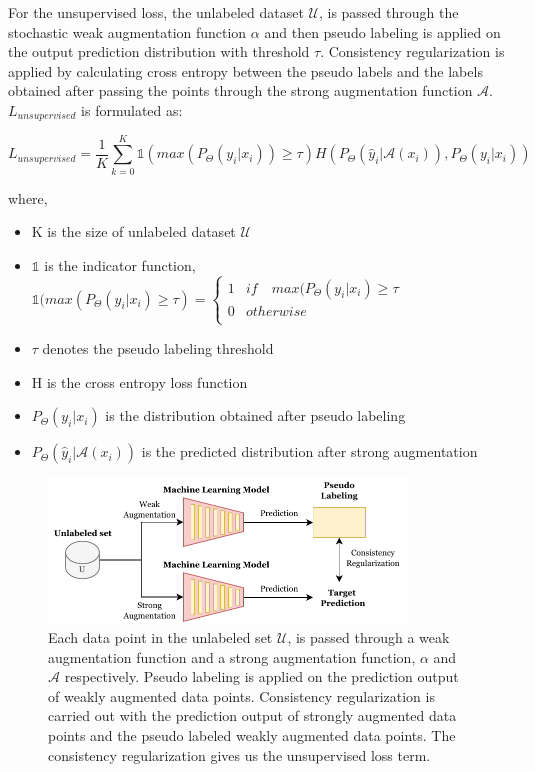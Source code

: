 For the unsupervised loss, the unlabeled dataset $\mathcal{U}$, is passed through the stochastic weak augmentation function $\alpha$ and then pseudo labeling is applied on the output prediction distribution with threshold $\tau$. Consistency regularization is applied by calculating cross entropy between the pseudo labels and the labels obtained after passing the points through the strong augmentation function $\mathcal{A}$. $L_{unsupervised}$ is formulated as:

\begin{equation}
    \label{equation:fixmatch_unsupervised_loss}
    L_{unsupervised} = \frac{1}{K} \sum_{k=0}^{K} \mathbb{1}(max(P_{\Theta}(y_i | x_i)) \geq \tau) H(P_{\Theta}(\hat{y}_i | \mathcal{A}(x_i)), P_{\Theta}(y_i | x_i))
\end{equation}

where,
\begin{itemize}[label={}]
  \setlength\itemsep{0em}
  \item K is the size of unlabeled dataset $\mathcal{U}$
  \item $\mathbb{1}$ is the indicator function, $\mathbb{1}(max(P_{\Theta}(y_i | x_i) \geq \tau) = \begin{cases} 
      1 & if \quad max(P_{\Theta}(y_i | x_i) \geq \tau \\
      0 & otherwise \\
   \end{cases}$ 
   \item $\tau$ denotes the pseudo labeling threshold 
   \item H is the cross entropy loss function
   \item $P_{\Theta}(y_i | x_i)$ is the distribution obtained after pseudo labeling
   \item $P_{\Theta}(\hat{y}_i | \mathcal{A}(x_i))$ is the predicted distribution after strong augmentation
\end{itemize}

\begin{figure}[htbp]
\centering
\captionsetup{format=plain}
\includegraphics[keepaspectratio,width=0.85\textwidth]{figures/fig_fixmatch.pdf}
\caption{Each data point in the unlabeled set $\mathcal{U}$, is passed through a weak augmentation function and a strong augmentation function, $\alpha$ and $\mathcal{A}$ respectively. Pseudo labeling is applied on the prediction output of weakly augmented data points. Consistency regularization is carried out with the prediction output of strongly augmented data points and the pseudo labeled weakly augmented data points. The consistency regularization gives us the unsupervised loss term.}
\label{fig:fixmatch}
\end{figure}
